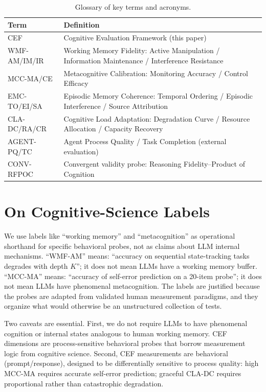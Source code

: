 \documentclass{article}
\begin{document}
\begin{table}[h]
\centering
\footnotesize
\caption{Glossary of key terms and acronyms.}
\label{tab:glossary}
\begin{tabular}{@{}lp{9cm}@{}}
\toprule
\textbf{Term} & \textbf{Definition} \\
\midrule
CEF & Cognitive Evaluation Framework (this paper) \\
WMF-AM/IM/IR & Working Memory Fidelity: Active Manipulation / Information Maintenance / Interference Resistance \\
MCC-MA/CE & Metacognitive Calibration: Monitoring Accuracy / Control Efficacy \\
EMC-TO/EI/SA & Episodic Memory Coherence: Temporal Ordering / Episodic Interference / Source Attribution \\
CLA-DC/RA/CR & Cognitive Load Adaptation: Degradation Curve / Resource Allocation / Capacity Recovery \\
AGENT-PQ/TC & Agent Process Quality / Task Completion (external evaluation) \\
CONV-RFPOC & Convergent validity probe: Reasoning Fidelity--Product of Cognition \\
\bottomrule
\end{tabular}
\end{table}

\section{On Cognitive-Science Labels}
\label{app:labels}

We use labels like ``working memory'' and ``metacognition'' as
operational shorthand for specific behavioral probes, not as
claims about LLM internal mechanisms. ``WMF-AM'' means: ``accuracy on
sequential state-tracking tasks degrades with depth $K$''; it does not
mean LLMs have a working memory buffer. ``MCC-MA'' means: ``accuracy
of self-error prediction on a 20-item probe''; it does not mean LLMs
have phenomenal metacognition. The labels are justified because the
probes are adapted from validated human measurement paradigms, and they
organize what would otherwise be an unstructured collection of tests.

Two caveats are essential. First, we do not require LLMs to have
phenomenal cognition or internal states analogous to human working memory.
CEF dimensions are process-sensitive behavioral probes that borrow
measurement logic from cognitive science. Second, CEF measurements are
behavioral (prompt/response), designed to be differentially sensitive to
process quality: high MCC-MA requires accurate self-error prediction;
graceful CLA-DC requires proportional rather than catastrophic
degradation.
\end{document}
